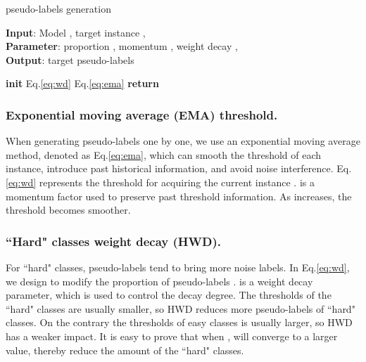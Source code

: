 \documentclass[runningheads]{llncs}
\begin{document}
\begin{algorithm}[tb]
\caption{pseudo-labels generation}
\label{alg:algorithm1}
\textbf{Input}: Model , target instance ,  \\
\textbf{Parameter}: proportion , momentum , weight decay ,    \\
\textbf{Output}: target pseudo-labels 
\begin{algorithmic}[1] \STATE \textbf{init} 
\FOR{ \TO } 
\STATE 
\STATE 
\FOR{ \TO }
\STATE 
\STATE   Eq.\eqref{eq:wd}
\ENDFOR
\STATE   Eq.\eqref{eq:ema}
\STATE 
\ENDFOR
\STATE \textbf{return} 
\end{algorithmic}
\end{algorithm}





\subsubsection{Exponential moving average (EMA) threshold.}When generating pseudo-labels one by one, we use an exponential moving average method, denoted as Eq.\eqref{eq:ema}, which can smooth the threshold of each instance, introduce past historical information, and avoid noise interference. Eq.\eqref{eq:wd}  represents the threshold for acquiring the current instance .  is a momentum factor used to preserve past threshold information. As  increases, the threshold  becomes smoother.





\subsubsection{``Hard" classes weight decay (HWD).}For ``hard" classes, pseudo-labels tend to bring more noise labels. In Eq.\eqref{eq:wd}, we design  to modify the proportion of pseudo-labels .  is a weight decay parameter, which is used to control the decay degree. The thresholds  of the ``hard" classes are usually smaller, so HWD reduces more pseudo-labels of ``hard" classes. On the contrary the thresholds  of easy classes is usually larger, so HWD has a weaker impact. It is easy to prove that when ,  will converge to a larger value, thereby reduce the amount of the ``hard" classes.
\end{document}
